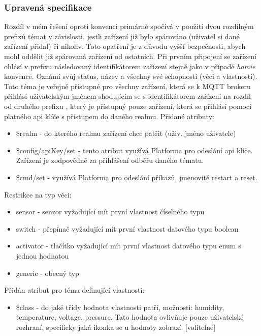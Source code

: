 \subsubsection{Upravená specifikace}
Rozdíl v mém řešení oproti  konvenci primárně spočívá v použití dvou rozdílným prefixů témat v závislosti, jestli zařízení již bylo spárováno (uživatel si dané zařízení přidal) či nikoliv. Toto opatření je z důvodu vyšší bezpečnosti, abych mohl oddělit již spárovaná zařízení od ostatních. Při prvním připojení se zařízení ohlásí v prefixu  následovaný identifikátorem zařízení stejně jako v případě \textit{homie} konvence. Oznámí svůj status, název a všechny své schopnosti (věci a vlastnosti). Toto téma je veřejně přístupné pro všechny zařízení, která se k MQTT brokeru přihlásí uživatelským jménem shodujícím se s identifikátorem zařízení na rozdíl od druhého prefixu , který je přístupný pouze zařízení, která se přihlásí pomocí platného api klíče s přístupem do daného realmu. Přidané atributy:
\begin{itemize}
    \item \$realm - do kterého realmu zařízení chce patřit (uživ. jméno uživatele)
    \item \$config/apiKey/set - tento atribut využívá Platforma pro odeslání api klíče. Zařízení je zodpovědně za přihlášení odběřu daného tématu.
    \item \$cmd/set - využívá Platforma pro odeslání příkazů, jmenovitě restart a reset.
\end{itemize}

Restrikce na typ věci:
\begin{itemize}
    \item sensor - senzor vyžadující mít první vlastnost číselného typu
    \item switch - přepínač vyžadující mít první vlastnost datového typu boolean
    \item activator - tlačítko vyžadující mít první vlastnost datového typu enum s jednou hodnotou
    \item generic - obecný typ
\end{itemize}

Přidán atribut pro téma definující vlastnosti:
\begin{itemize}
    \item \$class - do jaké třídy hodnota vlastnosti patří, možnosti: humidity, temperature, voltage, pressure. Tato hodnota ovlivňuje pouze uživatelské rozhraní, specificky jaká ikonka se u hodnoty zobrazí. [volitelné]
\end{itemize}


